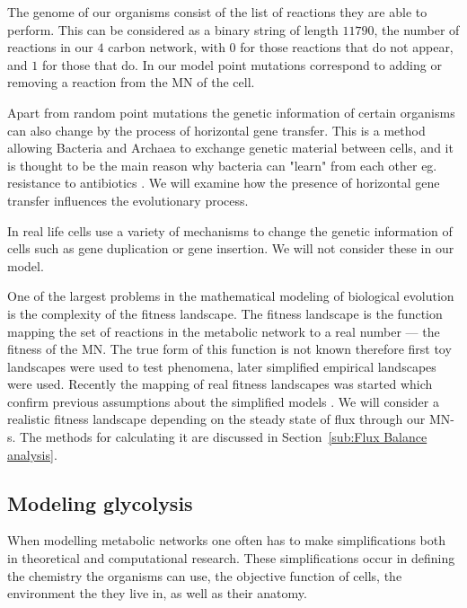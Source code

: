 \documentclass[a4paper,12pt]{article}
\begin{document}
	The genome of our organisms consist of the list of reactions they are able to perform. This can be considered as a binary string of length $11790$, the number of reactions in our $4$ carbon network, with $0$ for those reactions that do not appear, and $1$ for those that do. In our model point mutations correspond to adding or removing a reaction from the MN of the cell.

	Apart from random point mutations  the genetic information of certain organisms can also change by the process of horizontal gene transfer. This is a method allowing Bacteria and Archaea to exchange genetic material between cells, and it is thought to be the main reason why bacteria can "learn" from each other eg. resistance to antibiotics \cite{horizontalAntibiotics,horizontalgenetransfer}. We will examine how the presence of horizontal gene transfer influences the evolutionary process.

	In real life cells use a variety of mechanisms to change the genetic information of cells such as gene duplication or gene insertion. We will not consider these in our model. 


	One of the largest problems in the mathematical modeling of biological evolution is the complexity of the fitness landscape. The fitness landscape is the function mapping the set of reactions in the metabolic network to a real number --- the fitness of the MN. The true form of this function is not known therefore first toy landscapes were used to test phenomena, later simplified empirical landscapes were used. Recently the mapping of real fitness landscapes was started which confirm previous assumptions about the simplified models \cite{fitnesslandscape}. We will consider a realistic fitness landscape depending on the steady state of flux through our MN-s. The methods for calculating it are discussed in Section~\ref{sub:Flux Balance analysis}.

	\subsection{Modeling glycolysis}
	\label{sub:artificial_chemistries}


	When modelling metabolic networks one often has to make simplifications both in theoretical and computational research. These simplifications occur in defining the chemistry the organisms can use, the objective function of cells, the environment the they live in, as well as their anatomy. %
	
\end{document}
